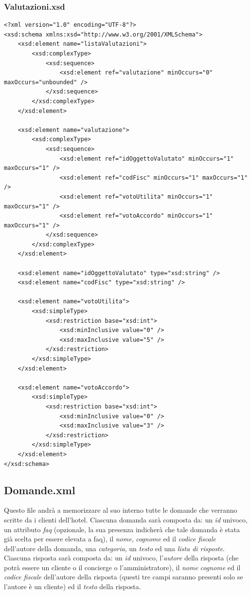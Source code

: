 \documentclass [a4paper, 12pt]{book}
\begin{document}
\subsubsection{Valutazioni.xsd}
\begin{lstlisting}[style=XML]
<?xml version="1.0" encoding="UTF-8"?>
<xsd:schema xmlns:xsd="http://www.w3.org/2001/XMLSchema">
    <xsd:element name="listaValutazioni">
        <xsd:complexType>
            <xsd:sequence>
                <xsd:element ref="valutazione" minOccurs="0" maxOccurs="unbounded" />
            </xsd:sequence>
        </xsd:complexType>
    </xsd:element>

    <xsd:element name="valutazione">
        <xsd:complexType>
            <xsd:sequence>
                <xsd:element ref="idOggettoValutato" minOccurs="1" maxOccurs="1" />
                <xsd:element ref="codFisc" minOccurs="1" maxOccurs="1" />
                <xsd:element ref="votoUtilita" minOccurs="1" maxOccurs="1" />
                <xsd:element ref="votoAccordo" minOccurs="1" maxOccurs="1" />
            </xsd:sequence>
        </xsd:complexType>
    </xsd:element>

    <xsd:element name="idOggettoValutato" type="xsd:string" />
    <xsd:element name="codFisc" type="xsd:string" />

    <xsd:element name="votoUtilita">
        <xsd:simpleType>
            <xsd:restriction base="xsd:int">
                <xsd:minInclusive value="0" />
                <xsd:maxInclusive value="5" />
            </xsd:restriction>
        </xsd:simpleType>
    </xsd:element>

    <xsd:element name="votoAccordo">
        <xsd:simpleType>
            <xsd:restriction base="xsd:int">
                <xsd:minInclusive value="0" />
                <xsd:maxInclusive value="3" />
            </xsd:restriction>
        </xsd:simpleType>
    </xsd:element>
</xsd:schema>
\end{lstlisting}

\subsection{Domande.xml}
Questo file andrà a memorizzare al suo interno tutte le domande che verranno scritte da i clienti dell'hotel. Ciascuna domanda sarà composta da:  un \textit{id} univoco, un attributo \textit{faq} (opzionale, la sua presenza indicherà che tale domanda è stata già scelta per essere elevata a faq), il \textit{nome}, \textit{cognome} ed il \textit{codice fiscale} dell'autore della domanda, una \textit{categoria}, un \textit{testo} ed una \textit{lista di risposte}. Ciascuna risposta sarà composta da: un \textit{id} univoco, l'\textit{autore} della risposta (che potrà essere un cliente o il concierge o l'amministratore), il \textit{nome} \textit{cognome} ed il \textit{codice fiscale} dell'autore della risposta (questi tre campi saranno presenti solo se l'autore è un cliente) ed il \textit{testo} della risposta.
\end{document}
